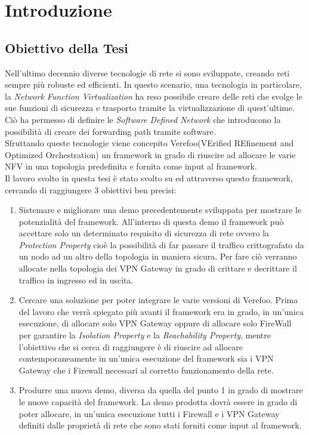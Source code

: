 

\hypersetup{
    colorlinks=true,
    linkcolor=blue
}

\chapter{Introduzione} \label{ch:intro}

\section{Obiettivo della Tesi} 

Nell'ultimo decennio diverse tecnologie di rete si sono sviluppate,
creando reti sempre più robuste ed efficienti. In questo scenario,
una tecnologia in particolare, la \textit{Network Function Virtualization} 
ha reso possibile creare delle reti che svolge le sue funzioni di sicurezza e
trasporto tramite la virtualizzazione di quest'ultime. Ciò ha permesso di definire
le \textit{Software Defined Network} che introducono la possibilità di creare dei forwarding
path tramite software.\\
Sfruttando queste tecnologie viene concepito Verefoo(VErified REfinement and Optimized Orchestration) 
un framework in grado di riuscire ad allocare le varie NFV in una topologia predefinita e fornita
come input al framework.\\
Il lavoro svolto in questa tesi è stato svolto su ed attraverso questo framework, cercando di raggiungere 3
obiettivi ben precisi:

\begin{enumerate}
    \item Sistemare e migliorare una demo precedentemente sviluppata per mostrare le potenzialità del framework.
        All'interno di questa demo il framework può accettare solo un determinato requisito di sicurezza di rete ovvero
        la \textit{Protection Property} cioè la possibilità di far passare il traffico crittografato da un nodo ad un altro della topologia
        in maniera sicura. Per fare ciò verranno allocate nella topologia dei VPN Gateway in grado di crittare e decrittare il traffico in ingresso ed in uscita.
    \item Cercare una soluzione per poter integrare le varie versioni di Verefoo. Prima del lavoro che verrà spiegato più avanti il framework era in grado, in un'unica 
        esecuzione, di allocare solo VPN Gateway oppure di allocare solo FireWall per garantire la \textit{Isolation Property} e la \textit{Reachability Property}, mentre
        l'obiettivo che si cerca di raggiungere è di riuscire ad allocare contemporaneamente in un'unica esecuzione del framework sia i VPN Gateway che i Firewall necessari
        al corretto funzionamento della rete.
    \item Produrre una nuova demo, diversa da quella del punto 1 in grado di mostrare le nuove capacità del framework. La demo prodotta dovrà essere in grado di poter allocare,
        in un'unica esecuzione tutti i Firewall e i VPN Gateway definiti dalle proprietà di rete che sono stati forniti come input al framework.
\end{enumerate}

